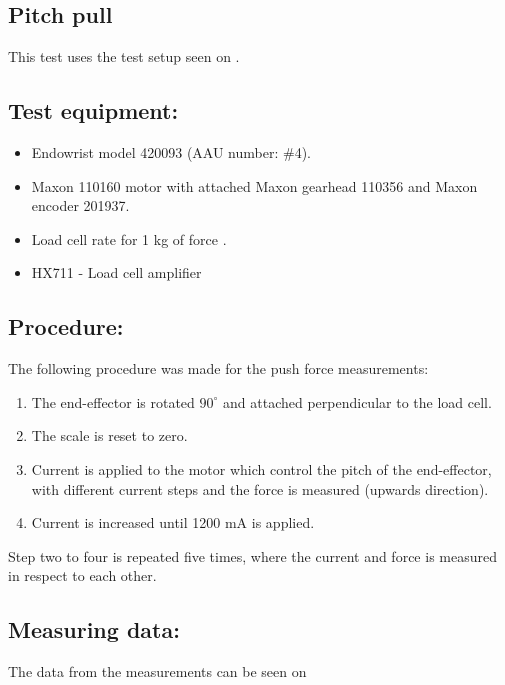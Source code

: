 \subsection{Pitch pull} %
This test uses the test setup seen on .


\subsection*{Test equipment:}
\begin{itemize}
\item Endowrist model 420093 (AAU number: \#4).
\item Maxon 110160 motor with attached Maxon gearhead 110356 and Maxon encoder 201937.
\item Load cell rate for 1 kg of force \cite{Load_cell_1kg}.
\item HX711 - Load cell amplifier \cite{HX711}
\end{itemize}

\subsection*{Procedure:}
The following procedure was made for the push force measurements:
\begin{enumerate}
\item The end-effector is rotated $90^\circ$ and attached perpendicular to the load cell. 
\item The scale is reset to zero.
\item Current is applied to the motor which control the pitch of the end-effector, with different current steps and the force is measured (upwards direction).
\item Current is increased until 1200 mA is applied.
\end{enumerate}
Step two to four is repeated five times, where the current and force is measured in respect to each other. 

\subsection*{Measuring data:}
The data from the measurements can be seen on %




